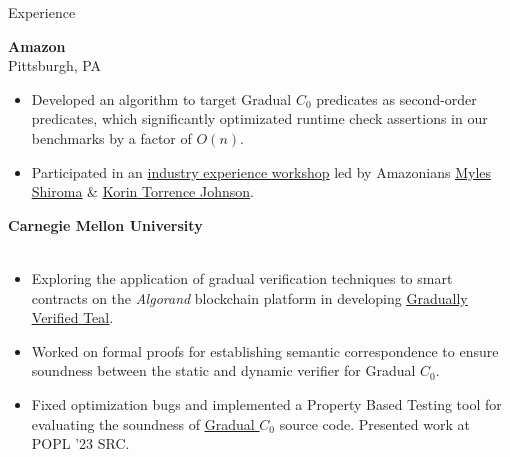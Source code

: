 \begin{rSection}{Experience}
	{\textbf{\large{Amazon}} \hfill \color{darkgray}{06/2023 - 08/2023} 
	\\ \vspace*{1mm}
	 \hfill{Pittsburgh, PA} 
	\\ 
	\color{black}
	\begin{minipage}{40em}
		\begin{itemize}
			\item Developed an algorithm to target Gradual $C_0$ predicates as second-order predicates, which significantly optimizated runtime check assertions in our benchmarks by a factor of $O(n)$.
			\item Participated in an \href{https://s3d.cmu.edu/sure/index.html}{\underline{industry experience workshop}} led by Amazonians \href{https://www.linkedin.com/in/myles-shiroma-a850a89/}{\underline{Myles Shiroma}} \& \href{https://www.linkedin.com/in/korin-torrence-johnson/}{\underline{Korin Torrence Johnson}}.
		\end{itemize}
	\end{minipage}}

	{\textbf{\large{Carnegie Mellon University}} \hfill \color{darkgray}{06/2022 - Present} 
	\\ \vspace*{1mm}
	 \hfill \color{darkgray}{Pittsburgh, PA} 
	\\ 
	\color{black}
	\begin{minipage}{40em}
		\begin{itemize}
			\item Exploring the application of gradual verification techniques to smart contracts on the \textit{Algorand} blockchain platform in developing \href{https://github.com/gradual-verification/gradual-TEAL}{\underline{Gradually Verified Teal}}.
			\item Worked on formal proofs for establishing semantic correspondence to ensure soundness between the static and dynamic verifier for Gradual $C_0$. 
			\item Fixed optimization bugs and implemented a Property Based Testing tool for evaluating the soundness of \href{https://github.com/gradual-verification/gvc0}{\underline{Gradual $C_0$}} source code. Presented work at POPL '23 SRC.
		\end{itemize}
	\end{minipage}} 


\end{rSection}
